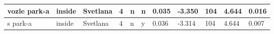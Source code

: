 \begin{longtable}{|p{4cm}|p{1cm}|p{1.2cm}|p{0.5cm}|p{0.5cm}|p{0.5cm}|R{1cm}|R{1cm}|R{1cm}|R{1cm}|R{1cm}|}
vozle park-a               & inside            & Svetlana      & 4                                   & n                          & n                          & 0.035      & -3.350        & 104                     & 4.644                         & 0.016                   \\ \hline
s park-a                   & inside            & Svetlana      & 4                                   & n                          & y                          & 0.036      & -3.314        & 104                     & 4.644                         & 0.007                   \\ \hline

\end{longtable}

\normalsize %